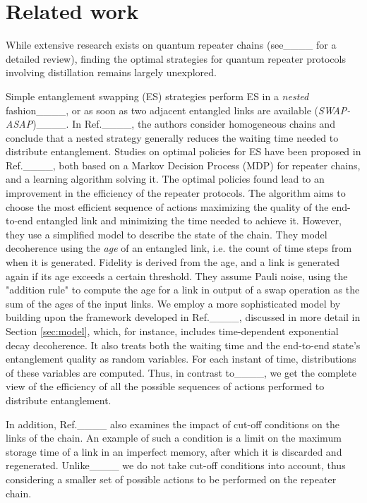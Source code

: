 \section{Related work}
While extensive research exists on quantum repeater chains (see____ for a detailed review), finding the optimal strategies for quantum repeater protocols involving distillation remains largely unexplored.

Simple entanglement swapping (ES) strategies perform ES in a \emph{nested} fashion____, or as soon as two adjacent entangled links are available (\emph{SWAP-ASAP})____.
In Ref.____, the authors consider homogeneous chains and conclude that a nested strategy generally reduces the waiting time needed to distribute entanglement.
Studies on optimal policies for ES have been proposed in Ref.____, both based on a Markov Decision Process (MDP) for repeater chains, and a learning algorithm solving it. The optimal policies found lead to an improvement in the efficiency of the repeater protocols.
% 
The algorithm aims to choose the most efficient sequence of actions maximizing the quality of the end-to-end entangled link and minimizing the time needed to achieve it. 
However, they use a simplified model to describe the state of the chain. 
% 
They model decoherence using the \emph{age} of an entangled link, i.e. the count of time steps from when it is generated. Fidelity is derived from the age, and a link is generated again if its age exceeds a certain threshold. They assume Pauli noise, using the "addition rule" to compute the age for a link in output of a swap operation as the sum of the ages of the input links.  
We employ a more sophisticated model by building upon the framework developed in Ref.____, discussed in more detail in Section \ref{sec:model}, which, for instance, includes time-dependent exponential decay decoherence. It also treats both the waiting time and the end-to-end state's entanglement quality as random variables. 
For each instant of time, distributions of these variables are computed.
Thus, in contrast to____, we get the complete view of the efficiency of all the possible sequences of actions performed to distribute entanglement.

In addition, Ref.____ also examines the impact of cut-off conditions on the links of the chain. An example of such a condition is a limit on the maximum storage time of a link in an imperfect memory, after which it is discarded and regenerated.
Unlike____ we do not take cut-off conditions into account, thus considering a smaller set of possible actions to be performed on the repeater chain.


